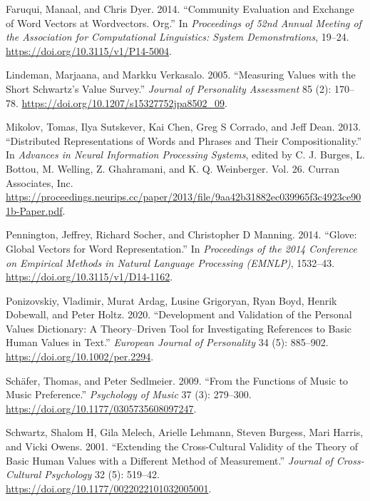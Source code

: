 \documentclass[
  letterpaper,
  DIV=11,
  numbers=noendperiod]{scrartcl}
\newlength{\cslhangindent}
\newlength{\cslentryspacingunit} %
\newenvironment{CSLReferences}[2] %
 {%
  \setlength{\parindent}{0pt}
  \ifodd #1
  \let\oldpar\par
  \def\par{\hangindent=\cslhangindent\oldpar}
  \fi
  \setlength{\parskip}{#2\cslentryspacingunit}
 }%
 {}
\begin{document}
\begin{CSLReferences}{1}{0}
\leavevmode{}%
Faruqui, Manaal, and Chris Dyer. 2014. {``Community Evaluation and
Exchange of Word Vectors at Wordvectors. Org.''} In \emph{Proceedings of
52nd {Annual} {Meeting} of the {Association} for {Computational}
{Linguistics}: {System} {Demonstrations}}, 19--24.
\url{https://doi.org/10.3115/v1/P14-5004}.

\leavevmode{}%
Lindeman, Marjaana, and Markku Verkasalo. 2005. {``Measuring Values with
the Short {Schwartz}'s Value Survey.''} \emph{Journal of Personality
Assessment} 85 (2): 170--78.
\url{https://doi.org/10.1207/s15327752jpa8502_09}.

\leavevmode{}%
Mikolov, Tomas, Ilya Sutskever, Kai Chen, Greg S Corrado, and Jeff Dean.
2013. {``Distributed {Representations} of {Words} and {Phrases} and
Their {Compositionality}.''} In \emph{Advances in {Neural} {Information}
{Processing} {Systems}}, edited by C. J. Burges, L. Bottou, M. Welling,
Z. Ghahramani, and K. Q. Weinberger. Vol. 26. Curran Associates, Inc.
\url{https://proceedings.neurips.cc/paper/2013/file/9aa42b31882ec039965f3c4923ce901b-Paper.pdf}.

\leavevmode{}%
Pennington, Jeffrey, Richard Socher, and Christopher D Manning. 2014.
{``Glove: {Global} Vectors for Word Representation.''} In
\emph{Proceedings of the 2014 Conference on Empirical Methods in Natural
Language Processing ({EMNLP})}, 1532--43.
\url{https://doi.org/10.3115/v1/D14-1162}.

\leavevmode{}%
Ponizovskiy, Vladimir, Murat Ardag, Lusine Grigoryan, Ryan Boyd, Henrik
Dobewall, and Peter Holtz. 2020. {``Development and Validation of the
Personal Values Dictionary: {A} Theory--Driven Tool for Investigating
References to Basic Human Values in Text.''} \emph{European Journal of
Personality} 34 (5): 885--902. \url{https://doi.org/10.1002/per.2294}.

\leavevmode{}%
Schäfer, Thomas, and Peter Sedlmeier. 2009. {``From the Functions of
Music to Music Preference.''} \emph{Psychology of Music} 37 (3):
279--300. \url{https://doi.org/10.1177/0305735608097247}.

\leavevmode{}%
Schwartz, Shalom H, Gila Melech, Arielle Lehmann, Steven Burgess, Mari
Harris, and Vicki Owens. 2001. {``Extending the Cross-Cultural Validity
of the Theory of Basic Human Values with a Different Method of
Measurement.''} \emph{Journal of Cross-Cultural Psychology} 32 (5):
519--42. \url{https://doi.org/10.1177/0022022101032005001}.

\end{CSLReferences}
\end{document}
